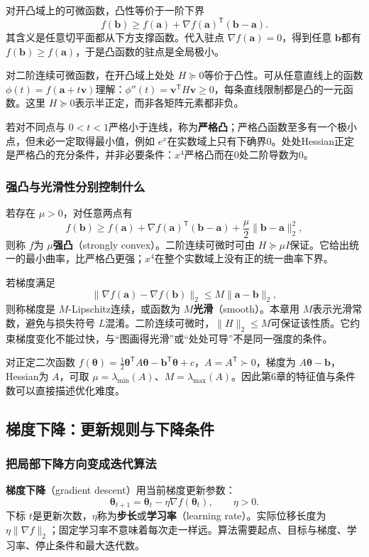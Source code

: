 \documentclass[UTF8,fontset=none,zihao=-4,a4paper]{ctexart}
\newcommand{\term}[1]{\textbf{#1}}
\numberwithin{equation}{section}
\numberwithin{figure}{section}
\begin{document}
对开凸域上的可微函数，凸性等价于一阶下界
\[
 f(\symbf b)\ge f(\symbf a)+\nabla f(\symbf a)^{\mathsf T}(\symbf b-\symbf a).
\]
其含义是任意切平面都从下方支撑函数。代入驻点 $\nabla f(\symbf a)=0$，得到任意 $\symbf b$都有 $f(\symbf b)\ge f(\symbf a)$，于是凸函数的驻点是全局极小。

对二阶连续可微函数，在开凸域上处处 $H\succeq0$等价于凸性。可从任意直线上的函数 $\phi(t)=f(\symbf a+t\symbf v)$理解：$\phi''(t)=\symbf v^{\mathsf T}H\symbf v\ge0$，每条直线限制都是凸的一元函数。这里 $H\succeq0$表示半正定，而非各矩阵元素都非负。

若对不同点与 $0<t<1$严格小于连线，称为\term{严格凸}；严格凸函数至多有一个极小点，但未必一定取得最小值，例如 $e^x$在实数域上只有下确界0。处处Hessian正定是严格凸的充分条件，并非必要条件：$x^4$严格凸而在0处二阶导数为0。

\subsubsection{强凸与光滑性分别控制什么}
若存在 $\mu>0$，对任意两点有
\[
 f(\symbf b)\ge f(\symbf a)+\nabla f(\symbf a)^{\mathsf T}(\symbf b-\symbf a)
 +\frac\mu2\|\symbf b-\symbf a\|_2^2,
\]
则称 $f$为 $\mu$\term{强凸}（strongly convex）。二阶连续可微时可由 $H\succeq\mu I$保证。它给出统一的最小曲率，比严格凸更强；$x^4$在整个实数域上没有正的统一曲率下界。

若梯度满足
\[
 \|\nabla f(\symbf a)-\nabla f(\symbf b)\|_2
 \le M\|\symbf a-\symbf b\|_2,
\]
则称梯度是 $M$-Lipschitz连续，或函数为 $M$\term{光滑}（smooth）。本章用 $M$表示光滑常数，避免与损失符号 $L$混淆。二阶连续可微时，$\|H\|_2\le M$可保证该性质。它约束梯度变化不能过快，与“图画得光滑”或“处处可导”不是同一强度的条件。

对正定二次函数 $f(\symbf\theta)=\frac12\symbf\theta^{\mathsf T}A\symbf\theta-\symbf b^{\mathsf T}\symbf\theta+c$，$A=A^{\mathsf T}\succ0$，梯度为 $A\symbf\theta-\symbf b$，Hessian为 $A$，可取 $\mu=\lambda_{\min}(A)$、$M=\lambda_{\max}(A)$。因此第6章的特征值与条件数可以直接描述优化难度。

\subsection{梯度下降：更新规则与下降条件}
\subsubsection{把局部下降方向变成迭代算法}
\term{梯度下降}（gradient descent）用当前梯度更新参数：
\begin{equation}\label{eq:gd-update}
 \symbf\theta_{t+1}=\symbf\theta_t-\eta\nabla f(\symbf\theta_t),\qquad\eta>0.
\end{equation}
下标 $t$是更新次数，$\eta$称为\term{步长}或\term{学习率}（learning rate）。实际位移长度为 $\eta\|\nabla f\|_2$；固定学习率不意味着每次走一样远。算法需要起点、目标与梯度、学习率、停止条件和最大迭代数。
\end{document}
